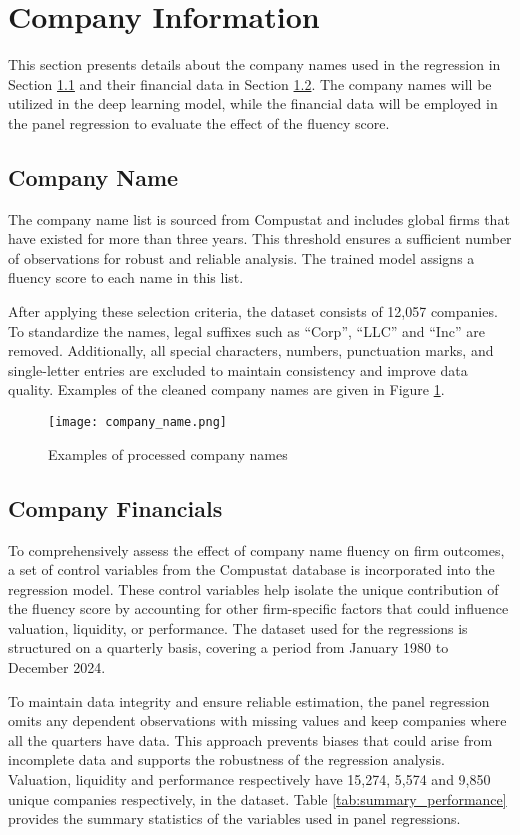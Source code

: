 \documentclass[a4paper,11pt]{report}
\begin{document}
\section{Company Information} \label{sec:company_info}
This section presents details about the company names used in the regression in Section \ref{company_name} and their financial data in Section \ref{company_fin}. The company names will be utilized in the deep learning model, while the financial data will be employed in the panel regression to evaluate the effect of the fluency score.
\subsection{Company Name} \label{company_name}
The company name list is sourced from Compustat and includes global firms that have existed for more than three years. This threshold ensures a sufficient number of observations for robust and reliable analysis. The trained model assigns a fluency score to each name in this list.

After applying these selection criteria, the dataset consists of 12,057 companies. To standardize the names, legal suffixes such as ``Corp'', ``LLC'' and ``Inc'' are removed. Additionally, all special characters, numbers, punctuation marks, and single-letter entries are excluded to maintain consistency and improve data quality. Examples of the cleaned company names are given in Figure \ref{fig:company_name}.

\begin{figure}[h!]
    \centering
    \texttt{[image: company\_name.png]}
    \caption{Examples of processed company names}
    \label{fig:company_name}
\end{figure}

\subsection{Company Financials} \label{company_fin}
To comprehensively assess the effect of company name fluency on firm outcomes, a set of control variables from the Compustat database is incorporated into the regression model. These control variables help isolate the unique contribution of the fluency score by accounting for other firm-specific factors that could influence valuation, liquidity, or performance. The dataset used for the regressions is structured on a quarterly basis, covering a period from January 1980 to December 2024.

To maintain data integrity and ensure reliable estimation, the panel regression omits any dependent observations with missing values and keep companies where all the quarters have data. This approach prevents biases that could arise from incomplete data and supports the robustness of the regression analysis. Valuation, liquidity and performance respectively have 15,274, 5,574 and 9,850 unique companies respectively, in the dataset. Table \ref{tab:summary_performance} provides the summary statistics of the variables used in panel regressions. 
\end{document}
